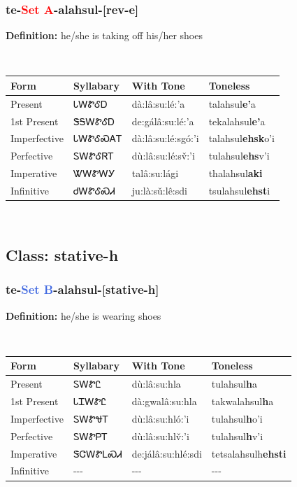 \subsubsection*{te{-}\textcolor{Red}{Set A}{-}\textbf{alahsul}{-}[rev-e]}
\nopagebreak
\textbf{Definition: } he/she is taking off his/her shoes
\\[0.5em]
\begin{tabularx}{\textwidth}{l X X X}%
\toprule%
\textbf{Form}&\textbf{Syllabary}&\textbf{With Tone}&\textbf{Toneless}\\%
\midrule%
Present&ᏓᎳᏑᎴᎠ&dà:lâ:su:lé:’a&talahsul\textbf{e'}a\\%
1st Present&ᏕᎦᎳᏑᎴᎠ&de:gálâ:su:lé:’a&tekalahsul\textbf{e'}a\\%
Imperfective&ᏓᎳᏑᎴᏍᎪᎢ&dà:lâ:su:lé:sgó:’i&talahsul\textbf{ehsk}o'i\\%
Perfective&ᏚᎳᏑᎴᏒᎢ&dù:lâ:su:lé:sv̌:’i&tulahsul\textbf{ehs}v'i\\%
Imperative&ᏔᎳᏑᎳᎩ&talâ:su:lági&thalahsul\textbf{aki}\\%
Infinitive&ᏧᎳᏑᎴᏍᏗ&ju:là:sǔ:lê:sdi&tsulahsul\textbf{ehst}i\\%
\bottomrule%
\end{tabularx}
\\[1em]
\needspace{3in}
\subsection*{Class: stative-h}
\nopagebreak
\needspace{2in}
\subsubsection*{te{-}\textcolor{RoyalBlue}{Set B}{-}\textbf{alahsul}{-}[stative-h]}
\nopagebreak
\textbf{Definition: } he/she is wearing shoes
\\[0.5em]
\begin{tabularx}{\textwidth}{l X X X}%
\toprule%
\textbf{Form}&\textbf{Syllabary}&\textbf{With Tone}&\textbf{Toneless}\\%
\midrule%
Present&ᏚᎳᏑᏝ&dù:lâ:su:hla&tulahsul\textbf{h}a\\%
1st Present&ᏓᏆᎳᏑᏝ&dà:gwalâ:su:hla&takwalahsul\textbf{h}a\\%
Imperfective&ᏚᎳᏑᏠᎢ&dù:lâ:su:hló:’i&tulahsul\textbf{h}o'i\\%
Perfective&ᏚᎳᏑᏢᎢ&dù:lâ:su:hlv̌:’i&tulahsul\textbf{h}v'i\\%
Imperative&ᏕᏣᎳᏑᏞᏍᏗ&de:jálâ:su:hlé:sdi&tetsalahsulh\textbf{ehsti}\\%
Infinitive&{-}{-}{-}&{-}{-}{-}&{-}{-}{-}\\%
\bottomrule%
\end{tabularx}
\\[1em]
\needspace{3in}
